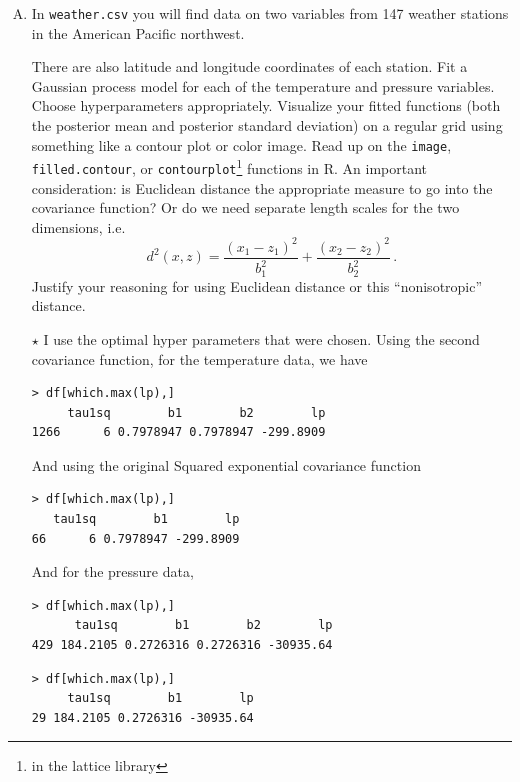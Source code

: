\documentclass[11pt]{article}
\newcommand{\jie}{$\star$ }
\begin{document}
\begin{enumerate}[(A)]
\newpage 
\item In \verb|weather.csv| you will find data on two variables from 147 weather stations in the American Pacific northwest.
There are also latitude and longitude coordinates of each  station.  Fit a Gaussian process model for each of the temperature and pressure variables.  Choose hyperparameters appropriately.  Visualize your fitted functions (both the posterior mean and posterior standard deviation) on a regular grid using something like a contour plot or color image.  Read up on the \verb|image|, \verb|filled.contour|, or \verb|contourplot|\footnote{in the lattice library} functions in R.  An important consideration: is Euclidean distance the appropriate measure to go into the covariance function?  Or do we need separate length scales for the two dimensions, i.e.
$$
d^2(x, z) = \frac{(x_1 - z_1)^2}{b_1^2} +  \frac{(x_2 - z_2)^2}{b_2^2} \, .
$$
Justify your reasoning for using Euclidean distance or this ``nonisotropic'' distance.

\bigskip \jie
I use the optimal hyper parameters that were chosen.
Using the second covariance function, for the temperature data, we have 
\begin{lstlisting}
> df[which.max(lp),]
     tau1sq        b1        b2        lp
1266      6 0.7978947 0.7978947 -299.8909
\end{lstlisting}
And using the original Squared exponential covariance function
\begin{lstlisting}
> df[which.max(lp),]
   tau1sq        b1        lp
66      6 0.7978947 -299.8909
\end{lstlisting}

And for the pressure data,
\begin{lstlisting}
> df[which.max(lp),]
      tau1sq        b1        b2        lp
429 184.2105 0.2726316 0.2726316 -30935.64
\end{lstlisting}
\begin{lstlisting}
> df[which.max(lp),]
     tau1sq        b1        lp
29 184.2105 0.2726316 -30935.64
\end{lstlisting}


\end{enumerate}
\end{document}
